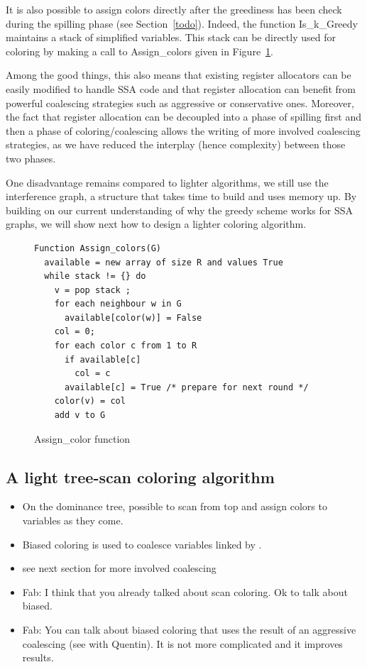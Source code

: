 {It is also possible to assign colors directly after the greediness has been check during the spilling phase (see Section~\ref{todo}).
Indeed, the function Is\_k\_Greedy maintains a stack of simplified variables. 
This stack can be directly used for coloring by making a call to Assign\_colors given in Figure~\ref{code:assign-color}. 

Among the good things, this also means that existing register allocators can be easily modified to handle SSA code and that register allocation can benefit from powerful coalescing strategies such as aggressive or conservative ones. 
Moreover, the fact that register allocation can be decoupled into a phase of spilling first and then a phase of coloring/coalescing allows the writing of more involved coalescing strategies, as we have reduced the interplay (hence complexity) between those two phases.

One disadvantage remains compared to lighter algorithms, we still use the interference graph, a structure that takes time to build and uses memory up.
By building on our current understanding of why the greedy scheme works for SSA graphs, we will show next how to design a 
lighter coloring algorithm.



\begin{figure}
\begin{verbatim}
Function Assign_colors(G)
  available = new array of size R and values True
  while stack != {} do
    v = pop stack ;
    for each neighbour w in G
      available[color(w)] = False
    col = 0;
    for each color c from 1 to R
      if available[c]
        col = c
      available[c] = True /* prepare for next round */
    color(v) = col
    add v to G
\end{verbatim}
\caption{Assign\_color function}
\label{code:assign-color}
\end{figure}



\subsection{A light tree-scan coloring algorithm}
{\sl
\begin{itemize}
  \item On the dominance tree, possible to scan from top and assign colors to 
    variables as they come.
  \item Biased coloring is used to coalesce variables linked by \phifuns.
  \item see next section for more involved coalescing
  \item Fab: I think that you already talked about scan coloring. Ok to talk about biased.
  \item Fab: You can talk about biased coloring that uses the result of an aggressive coalescing (see with Quentin). It is not more complicated and it improves results.
\end{itemize}
}

}
